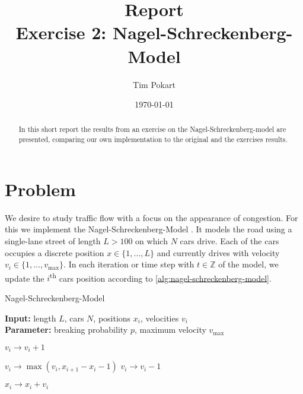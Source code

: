 \documentclass[aps,pra,showpacs,preprintnumbers,amsmath,amssymb,nofootinbib]{revtex4-2}
\begin{document}
    \title{Report\\Exercise 2: Nagel-Schreckenberg-Model}
    \author{Tim Pokart}
    \date{\today}
    
    \begin{abstract}
        In this short report the results from an exercise on the Nagel-Schreckenberg-model are presented, comparing our own implementation to the original \cite{NASC92} and the exercises \cite{SC22} results.
    \end{abstract}
        
    \maketitle

    \tableofcontents

    \section{Problem}

    We desire to study traffic flow with a focus on the appearance of congestion.
    For this we implement the Nagel-Schreckenberg-Model \cite{NASC92}.
    It models the road using a single-lane street of length $L > 100$ on which $N$ cars drive.
    Each of the cars occupies a discrete position $x \in \{1, \ldots, L\}$ and currently drives with velocity $v_i \in \{1,\ldots, v_{\mathrm{max}}\}$.
    In each iteration or time step with $t \in \mathbb{Z}$ of the model, we update the $i$\textsuperscript{th} cars position according to \cref{alg:nagel-schreckenberg-model}. 
    
    \begin{algorithm}[H]
        \caption{Nagel-Schreckenberg-Model}
        \label{alg:nagel-schreckenberg-model}
        \textbf{Input:} length $L$, cars $N$, positions $x_i$, velocities $v_i$\\
        \textbf{Parameter:} breaking probability $p$, maximum velocity $v_{\mathrm{max}}$

        \begin{algorithmic}[1]
                 
                    \State $v_i \rightarrow v_i + 1$
                \EndIf

                \State $v_i \rightarrow \max (v_i, x_{i+1} - x_i - 1)$ 
                 
                    \State $v_i \rightarrow v_i - 1$
                \EndIf

                \State $x_i \rightarrow x_i + v_i$ 
            \EndProcedure
            \Statex
                \State {}
            \EndFor
        \end{algorithmic}

    \end{algorithm}
\end{document}
